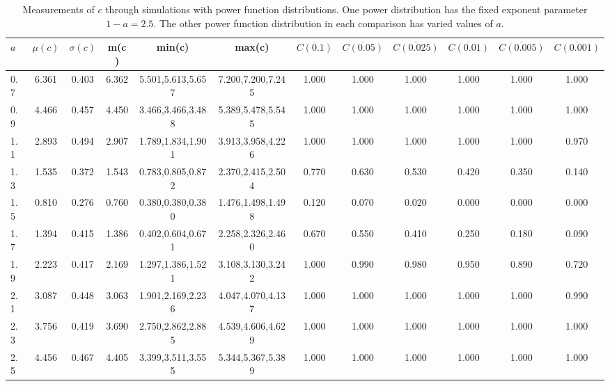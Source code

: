 \begin{table*}[h!]
\begin{center}
\begin{tabular}{| l | c | c | c | c | c | c | c | c | c | c | c |}\hline
$a$ & $\mu(c)$ & $\sigma(c)$ & m(c) & min(c) & max(c) & $\overline{C(0.1)}$ & $\overline{C(0.05)}$ & $\overline{C(0.025)}$ & $\overline{C(0.01)}$ & $\overline{C(0.005)}$ & $\overline{C(0.001)}$ \\\hline
0.7 & 6.361 & 0.403 & 6.362 & 5.501,5.613,5.657 & 7.200,7.200,7.245  & 1.000  & 1.000  & 1.000  & 1.000  & 1.000  & 1.000 \\\hline
0.9 & 4.466 & 0.457 & 4.450 & 3.466,3.466,3.488 & 5.389,5.478,5.545  & 1.000  & 1.000  & 1.000  & 1.000  & 1.000  & 1.000 \\\hline
1.1 & 2.893 & 0.494 & 2.907 & 1.789,1.834,1.901 & 3.913,3.958,4.226  & 1.000  & 1.000  & 1.000  & 1.000  & 1.000  & 0.970 \\\hline
1.3 & 1.535 & 0.372 & 1.543 & 0.783,0.805,0.872 & 2.370,2.415,2.504  & 0.770  & 0.630  & 0.530  & 0.420  & 0.350  & 0.140 \\\hline
1.5 & 0.810 & 0.276 & 0.760 & 0.380,0.380,0.380 & 1.476,1.498,1.498  & 0.120  & 0.070  & 0.020  & 0.000  & 0.000  & 0.000 \\\hline
1.7 & 1.394 & 0.415 & 1.386 & 0.402,0.604,0.671 & 2.258,2.326,2.460  & 0.670  & 0.550  & 0.410  & 0.250  & 0.180  & 0.090 \\\hline
1.9 & 2.223 & 0.417 & 2.169 & 1.297,1.386,1.521 & 3.108,3.130,3.242  & 1.000  & 0.990  & 0.980  & 0.950  & 0.890  & 0.720 \\\hline
2.1 & 3.087 & 0.448 & 3.063 & 1.901,2.169,2.236 & 4.047,4.070,4.137  & 1.000  & 1.000  & 1.000  & 1.000  & 1.000  & 0.990 \\\hline
2.3 & 3.756 & 0.419 & 3.690 & 2.750,2.862,2.885 & 4.539,4.606,4.629  & 1.000  & 1.000  & 1.000  & 1.000  & 1.000  & 1.000 \\\hline
2.5 & 4.456 & 0.467 & 4.405 & 3.399,3.511,3.555 & 5.344,5.367,5.389  & 1.000  & 1.000  & 1.000  & 1.000  & 1.000  & 1.000 \\\hline
\end{tabular}
\caption{Measurements of $c$ through simulations
        with power function distributions.
        One power distribution has the fixed exponent parameter $1-a=2.5$.
        The other power function distribution in each comparison
        has varied values of $a$.}
\end{center}
\end{table*}
